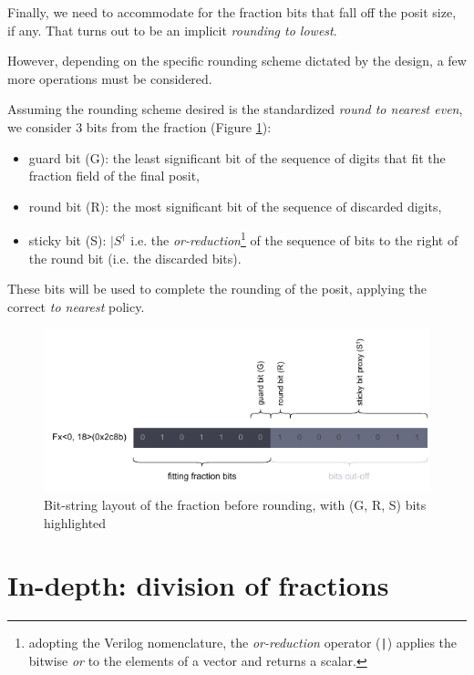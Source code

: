 Finally, we need to accommodate for the fraction bits that fall off the posit size, if any. That turns out to be an implicit \textit{rounding to lowest}.

However, depending on the specific rounding scheme dictated by the design, a few more operations must be considered.

Assuming the rounding scheme desired is the standardized \textit{round to nearest even}, we consider 3 bits from the fraction  (Figure \ref{fig:fraction_before_rounding}):
\begin{itemize}
\item guard bit (G): the least significant bit of the sequence of digits that fit the fraction field of the final posit,
\item round bit (R): the most significant bit of the sequence of discarded digits,
\item sticky bit (S): $|S^{\dagger}$ i.e. the \textit{or-reduction}\footnote{adopting the Verilog nomenclature, the \textit{or-reduction} operator (\texttt{|}) applies the bitwise \textit{or} to the elements of a vector and returns a scalar.
} of the sequence of bits to the right of the round bit (i.e. the discarded bits).
\end{itemize}

These bits will be used to complete the rounding of the posit, applying the correct \textit{to nearest} policy.




\begin{figure}
    \begin{center}
    \includegraphics[width=\textwidth]{figures/bits-fraction.drawio.pdf}
    \caption{Bit-string layout of the fraction before rounding, with (G, R, S) bits highlighted}
    \label{fig:fraction_before_rounding}
    \end{center}
\end{figure}


\section{In-depth: division of fractions}\label{Approximated_Algorithms}
